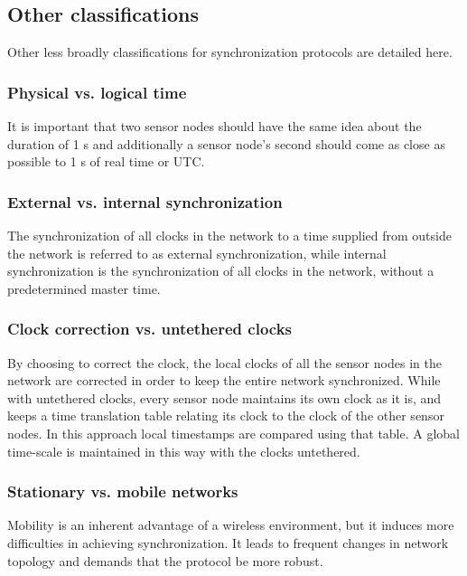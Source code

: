 \setcounter{secnumdepth}{3}
\subsection{Other classifications}
Other less broadly classifications for synchronization protocols are detailed here.

\setcounter{secnumdepth}{0}
\subsubsection{Physical vs. logical time}
It is important that two sensor nodes should have the same idea about the duration of 1 s and additionally a sensor node's second should come as close as possible to 1 s of real time or \ac{UTC}.

\subsubsection{External vs. internal synchronization}
The synchronization of all clocks in the network to a time supplied from outside the network is referred to as external synchronization, while internal synchronization is the synchronization of all clocks in the network, without a predetermined master time.

\subsubsection{Clock correction vs. untethered clocks}
By choosing to correct the clock, the local clocks of all the sensor nodes in the network are corrected in order to keep the
entire network synchronized. While with untethered clocks, every sensor node maintains its own clock as it is, and keeps a time translation table relating its clock to the clock of the other sensor nodes. In this approach local timestamps are compared using that table. A global time-scale is maintained in this way with the clocks untethered.

\subsubsection{Stationary vs. mobile networks}
Mobility is an inherent advantage of a wireless environment, but it induces more difficulties in achieving synchronization. It leads to frequent changes in network topology and demands that the protocol be more robust.

